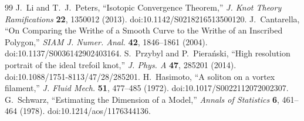 \begin{thebibliography}{99}
 J.~Li and T.~J.~Peters, ``Isotopic Convergence Theorem,'' \emph{J. Knot Theory Ramifications} \textbf{22}, 1350012 (2013). doi:10.1142/S0218216513500120.
 J.~Cantarella, ``On Comparing the Writhe of a Smooth Curve to the Writhe of an Inscribed Polygon,'' \emph{SIAM J. Numer. Anal.} \textbf{42}, 1846--1861 (2004). doi:10.1137/S0036142902403164.
 S.~Przybyl and P.~Piera\'nski, ``High resolution portrait of the ideal trefoil knot,'' \emph{J. Phys. A} \textbf{47}, 285201 (2014). doi:10.1088/1751-8113/47/28/285201.
 H.~Hasimoto, ``A soliton on a vortex filament,'' \emph{J. Fluid Mech.} \textbf{51}, 477--485 (1972). doi:10.1017/S0022112072002307.
 G.~Schwarz, ``Estimating the Dimension of a Model,'' \emph{Annals of Statistics} \textbf{6}, 461--464 (1978). doi:10.1214/aos/1176344136.
\end{thebibliography}
